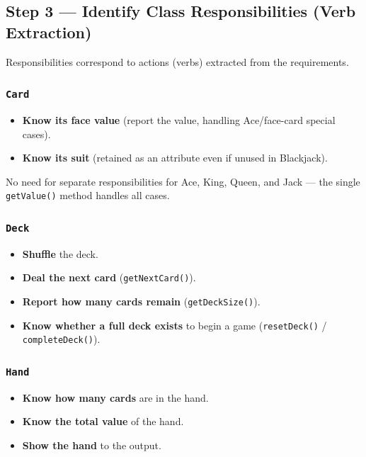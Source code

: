 \documentclass[11pt, a4paper, notitlepage]{report}
\theoremstyle{definition}
\theoremstyle{remark}
\theoremstyle{definition}
\begin{document}
\subsection{Step 3 --- Identify Class Responsibilities (Verb Extraction)}
\label{subsec:ch8-verbs}

Responsibilities correspond to actions (verbs) extracted from the requirements.

\subsubsection{\texttt{Card}}
\begin{itemize}
  \item \textbf{Know its face value} (report the value, handling Ace/face-card special cases).
  \item \textbf{Know its suit} (retained as an attribute even if unused in Blackjack).
\end{itemize}
No need for separate responsibilities for Ace, King, Queen, and Jack --- the single
\texttt{getValue()} method handles all cases.

\subsubsection{\texttt{Deck}}
\begin{itemize}
  \item \textbf{Shuffle} the deck.
  \item \textbf{Deal the next card} (\texttt{getNextCard()}).
  \item \textbf{Report how many cards remain} (\texttt{getDeckSize()}).
  \item \textbf{Know whether a full deck exists} to begin a game
        (\texttt{resetDeck()} / \texttt{completeDeck()}).
\end{itemize}

\subsubsection{\texttt{Hand}}
\begin{itemize}
  \item \textbf{Know how many cards} are in the hand.
  \item \textbf{Know the total value} of the hand.
  \item \textbf{Show the hand} to the output.
\end{itemize}
\end{document}
